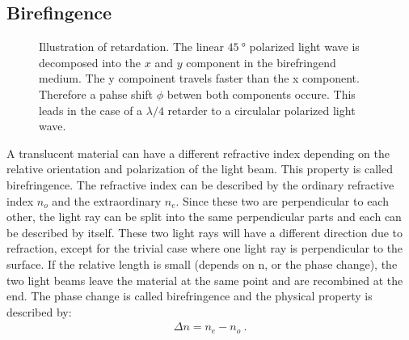 \subsection{Birefingence}
%
\begin{figure}[!t]
\centering
\setlength{\tikzwidth}{\textwidth}
\caption{Illustration of retardation. The linear $\SI{45}{\degree}$ polarized light wave is decomposed into the $x$ and $y$ component in the birefringend medium. The y compoinent travels faster than the x component. Therefore a pahse shift $\phi$ betwen both components occure. This leads in the case of a $\lambda/4$ retarder to a circulalar polarized light wave. }
\label{fig:optic_retardation}
\end{figure}
% 
A translucent material can have a different refractive index depending on the relative orientation and polarization of the light beam.
This property is called birefringence.
The refractive index can be described by the ordinary refractive index $n_o$ and the extraordinary $n_e$.
Since these two are perpendicular to each other, the light ray can be split into the same perpendicular parts and each can be described by itself.
These two light rays will have a different direction due to refraction, except for the trivial case where one light ray is perpendicular to the surface.
If the relative length is small (depends on n, or the phase change), the two light beams leave the material at the same point and are recombined at the end.
The phase change is called birefringence and the physical property is described by:
% 
\begin{align}
    \Delta n = n_e - n_o \> .
\end{align}
% 
% 
% 
